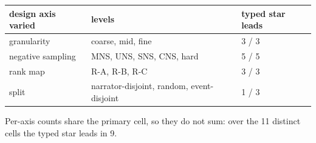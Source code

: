 \setlength{\tabcolsep}{2pt}
\begin{tabular}{lll}
\toprule
design axis varied & levels & typed star leads \\
\midrule
granularity & coarse, mid, fine & 3 / 3 \\
negative sampling & MNS, UNS, SNS, CNS, hard & 5 / 5 \\
rank map & R-A, R-B, R-C & 3 / 3 \\
split & narrator-disjoint, random, event-disjoint & 1 / 3 \\
\bottomrule
\end{tabular}

\vspace{2pt}
{\footnotesize Per-axis counts share the primary cell, so they do not sum: over the 11 distinct cells the typed star leads in 9.}